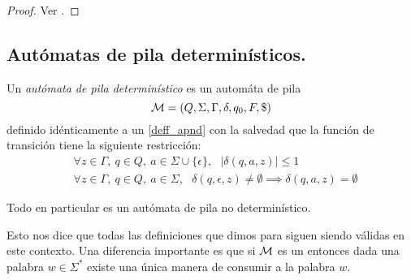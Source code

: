 \documentclass[tesis.tex]{subfiles}
\begin{document}
\begin{proof}
	Ver \cite[pp. 245-246, 248-250]{hopcraft-ullman}.
\end{proof}


\subsection{Autómatas de pila determinísticos.} 
\begin{deff}
	Un \emph{autómata de pila determinístico} es un automáta de pila 
	\[
	{\cal M } = (Q, \Sigma, \Gamma, \delta, q_0, F, \$)
	\]
	definido idénticamente a un \APND \ref{deff_apnd} con la salvedad que la función de transición tiene la siguiente restricción:
	\begin{align*}
		&\forall z \in \Gamma, \ q \in Q, \ a \in \Sigma \cup \{ \epsilon \}, \ \ \  |\delta(q,a, z)| \le 1   \\
		&\forall z \in \Gamma, \ q \in Q, \ a \in \Sigma, \ \ \ 
		\delta(q,\epsilon,z) \neq \emptyset \implies \delta(q,a,z) = \emptyset
	\end{align*}
	
	
\end{deff}

\begin{obs}
	Todo \APD en particular es un autómata de pila no determinístico. 
\end{obs}

Esto nos dice que todas las definiciones que dimos para \APND siguen siendo válidas en este contexto.
Una diferencia importante es que si ${\cal M }$ es un \APD entonces dada una palabra $w \in \Sigma^*$ existe una única manera de consumir a la palabra $w$.
%
\end{document}
